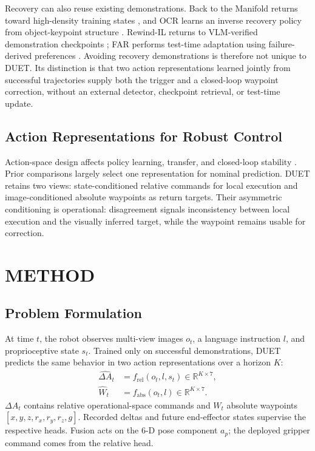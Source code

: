 \documentclass[letterpaper, 10 pt, conference]{ieeeconf}
\begin{document}
Recovery can also reuse existing demonstrations. Back to the Manifold returns toward high-density training states \cite{backtomanifold}, and OCR learns an inverse recovery policy from object-keypoint structure \cite{ocr}. Rewind-IL returns to VLM-verified demonstration checkpoints \cite{rewindil}; FAR performs test-time adaptation using failure-derived preferences \cite{far}. Avoiding recovery demonstrations is therefore not unique to DUET. Its distinction is that two action representations learned jointly from successful trajectories supply both the trigger and a closed-loop waypoint correction, without an external detector, checkpoint retrieval, or test-time update.

\subsection{Action Representations for Robust Control}
Action-space design affects policy learning, transfer, and closed-loop stability \cite{aljalbout2024actionspace,feng2026demystifying}. Prior comparisons largely select one representation for nominal prediction. DUET retains two views: state-conditioned relative commands for local execution and image-conditioned absolute waypoints as return targets. Their asymmetric conditioning is operational: disagreement signals inconsistency between local execution and the visually inferred target, while the waypoint remains usable for correction.

\section{METHOD}

\subsection{Problem Formulation}
At time $t$, the robot observes multi-view images $o_t$, a language instruction $l$, and proprioceptive state $s_t$. Trained only on successful demonstrations, DUET predicts the same behavior in two action representations over a horizon $K$:
\begin{align}
    \hat{\Delta A}_t &= f_{\mathrm{rel}}(o_t,l,s_t)
    \in \mathbb{R}^{K\times 7}, \\
    \hat{W}_t &= f_{\mathrm{abs}}(o_t,l)
    \in \mathbb{R}^{K\times 7}.
\end{align}
$\Delta A_t$ contains relative operational-space commands and $W_t$ absolute waypoints $[x,y,z,r_x,r_y,r_z,g]$. Recorded deltas and future end-effector states supervise the respective heads. Fusion acts on the 6-D pose component $a_p$; the deployed gripper command comes from the relative head.
\end{document}

